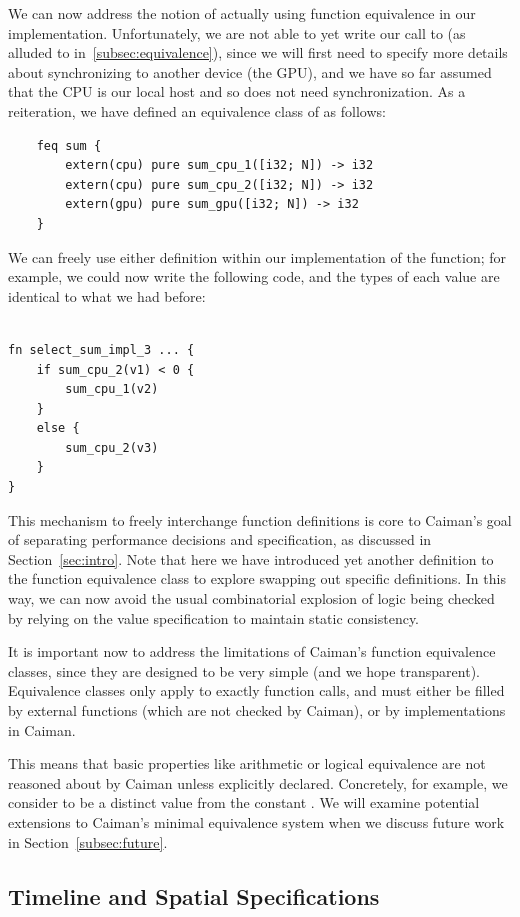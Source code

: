 We can now address the notion of actually using function equivalence in our implementation.  Unfortunately, we are not able to yet write our call to  (as alluded to in~\ref{subsec:equivalence}), since we will first need to specify more details about synchronizing to another device (the GPU), and we have so far assumed that the CPU is our local host and so does not need synchronization.  As a reiteration, we have defined an equivalence class of  as follows:
%
\begin{lstlisting}
	feq sum {
		extern(cpu) pure sum_cpu_1([i32; N]) -> i32
		extern(cpu) pure sum_cpu_2([i32; N]) -> i32
		extern(gpu) pure sum_gpu([i32; N]) -> i32
	}
\end{lstlisting}
%
We can freely use either definition within our implementation of the  function; for example, we could now write the following code, and the types of each value are identical to what we had before:
%
\begin{lstlisting}

fn select_sum_impl_3 ... {
    if sum_cpu_2(v1) < 0 { 
        sum_cpu_1(v2)
    }
    else {
        sum_cpu_2(v3)
    }
}
\end{lstlisting}
%
This mechanism to freely interchange function definitions is core to Caiman's goal of separating performance decisions and specification, as discussed in Section~\ref{sec:intro}.  Note that here we have introduced yet another definition to the  function equivalence class to explore swapping out specific definitions.  In this way, we can now avoid the usual combinatorial explosion of logic being checked by relying on the value specification to maintain static consistency.

It is important now to address the limitations of Caiman's function equivalence classes, since they are designed to be very simple (and we hope transparent).  Equivalence classes only apply to exactly function calls, and must either be filled by external functions (which are not checked by Caiman), or by implementations in Caiman.

This means that basic properties like arithmetic or logical equivalence are not reasoned about by Caiman unless explicitly declared.  Concretely, for example, we consider  to be a distinct value from the constant .  We will examine potential extensions to Caiman's minimal equivalence system when we discuss future work in Section~\ref{subsec:future}.

\subsection{Timeline and Spatial Specifications}
\label{subsec:spec}

